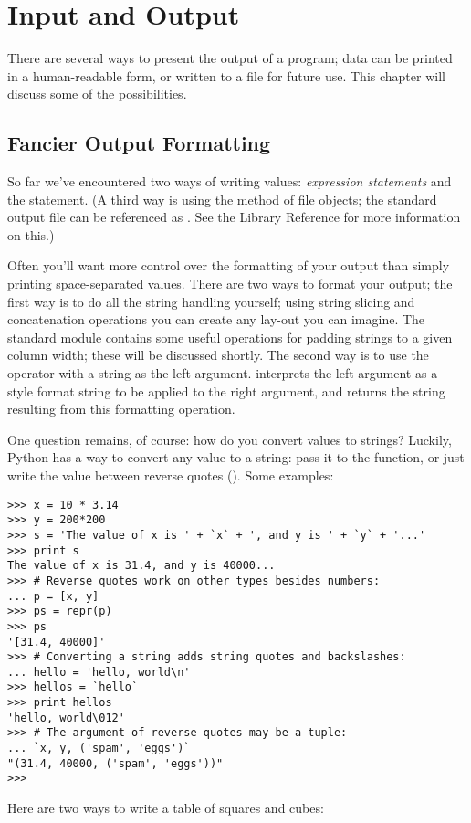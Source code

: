 \chapter{Input and Output}

There are several ways to present the output of a program; data can be
printed in a human-readable form, or written to a file for future use.
This chapter will discuss some of the possibilities.

\section{Fancier Output Formatting}
So far we've encountered two ways of writing values: \emph{expression
statements} and the  statement.  (A third way is using the
 method of file objects; the standard output file can be
referenced as .  See the Library Reference for more
information on this.)

Often you'll want more control over the formatting of your output than
simply printing space-separated values.  There are two ways to format
your output; the first way is to do all the string handling yourself;
using string slicing and concatenation operations you can create any
lay-out you can imagine.  The standard module  contains
some useful operations for padding strings to a given column width;
these will be discussed shortly.  The second way is to use the
\code{\%} operator with a string as the left argument.  \code{\%}
interprets the left argument as a \C{} -style format
string to be applied to the right argument, and returns the string
resulting from this formatting operation.

One question remains, of course: how do you convert values to strings?
Luckily, Python has a way to convert any value to a string: pass it to
the  function, or just write the value between reverse
quotes ().  Some examples:

\bcode\begin{verbatim}
>>> x = 10 * 3.14
>>> y = 200*200
>>> s = 'The value of x is ' + `x` + ', and y is ' + `y` + '...'
>>> print s
The value of x is 31.4, and y is 40000...
>>> # Reverse quotes work on other types besides numbers:
... p = [x, y]
>>> ps = repr(p)
>>> ps
'[31.4, 40000]'
>>> # Converting a string adds string quotes and backslashes:
... hello = 'hello, world\n'
>>> hellos = `hello`
>>> print hellos
'hello, world\012'
>>> # The argument of reverse quotes may be a tuple:
... `x, y, ('spam', 'eggs')`
"(31.4, 40000, ('spam', 'eggs'))"
>>>
\end{verbatim}\ecode
%
Here are two ways to write a table of squares and cubes:

